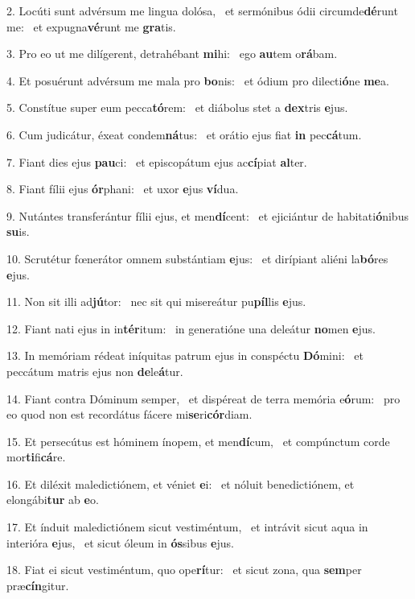 2. Locúti sunt advérsum me lingua dolósa, \dag\  et sermónibus ódii circumde\textbf{dé}runt me: \ast\  et expugna\textbf{vé}runt me \textbf{gra}tis.\

3. Pro eo ut me dilígerent, detrahébant \textbf{mi}hi: \ast\  ego \textbf{au}tem o\textbf{rá}bam.\

4. Et posuérunt advérsum me mala pro \textbf{bo}nis: \ast\  et ódium pro dilecti\textbf{ó}ne \textbf{me}a.\

5. Constítue super eum pecca\textbf{tó}rem: \ast\  et diábolus stet a \textbf{dex}tris \textbf{e}jus.\

6. Cum judicátur, éxeat condem\textbf{ná}tus: \ast\  et orátio ejus fiat \textbf{in} pec\textbf{cá}tum.\

7. Fiant dies ejus \textbf{pau}ci: \ast\  et episcopátum ejus ac\textbf{cí}piat \textbf{al}ter.\

8. Fiant fílii ejus \textbf{ór}phani: \ast\  et uxor \textbf{e}jus \textbf{ví}dua.\

9. Nutántes transferántur fílii ejus, et men\textbf{dí}cent: \ast\  et ejiciántur de habitati\textbf{ó}nibus \textbf{su}is.\

10. Scrutétur fœnerátor omnem substántiam \textbf{e}jus: \ast\  et dirípiant aliéni la\textbf{bó}res \textbf{e}jus.\

11. Non sit illi ad\textbf{jú}tor: \ast\  nec sit qui misereátur pu\textbf{píl}lis \textbf{e}jus.\

12. Fiant nati ejus in in\textbf{tér}itum: \ast\  in generatióne una deleátur \textbf{no}men \textbf{e}jus.\

13. In memóriam rédeat iníquitas patrum ejus in conspéctu \textbf{Dó}mini: \ast\  et peccátum matris ejus non \textbf{de}le\textbf{á}tur.\

14. Fiant contra Dóminum semper, \dag\  et dispéreat de terra memória e\textbf{ó}rum: \ast\  pro eo quod non est recordátus fácere mi\textbf{se}ri\textbf{cór}diam.\

15. Et persecútus est hóminem ínopem, et men\textbf{dí}cum, \ast\  et compúnctum corde mor\textbf{ti}fi\textbf{cá}re.\

16. Et diléxit maledictiónem, et véniet \textbf{e}i: \ast\  et nóluit benedictiónem, et elongábi\textbf{tur} ab \textbf{e}o.\

17. Et índuit maledictiónem sicut vestiméntum, \dag\  et intrávit sicut aqua in interióra \textbf{e}jus, \ast\  et sicut óleum in \textbf{ós}sibus \textbf{e}jus.\

18. Fiat ei sicut vestiméntum, quo ope\textbf{rí}tur: \ast\  et sicut zona, qua \textbf{sem}per præ\textbf{cín}gitur.\

